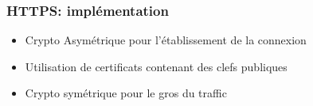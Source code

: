 \begin{frame}
    \frametitle{HTTPS: implémentation}
    \begin{itemize}
        \item Crypto Asymétrique pour l'établissement de la connexion
        \item Utilisation de certificats contenant des clefs publiques
        \item Crypto symétrique pour le gros du traffic
    \end{itemize}
\end{frame}


